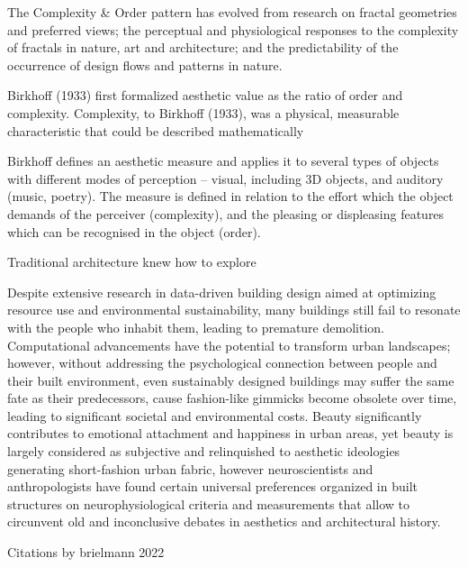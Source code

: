 The Complexity & Order pattern has evolved from research on fractal geometries and preferred views; the perceptual and physiological responses to the complexity of fractals in nature, art and architecture; and the predictability of the occurrence of design flows and patterns in nature.\cite{Browning2014}

Birkhoff (1933)\cite{Birkhoff1933} first formalized aesthetic value as the ratio of order and complexity.
Complexity, to Birkhoff (1933), was a
physical, measurable characteristic that could be described
mathematically \cite{Bies2016}

Birkhoff\cite{Birkhoff1933} defines an aesthetic measure and applies it to several types of objects with different modes of perception – visual, including
3D objects, and auditory (music, poetry).
The measure is defined in relation to the effort which the object demands of the perceiver (complexity), and the pleasing or displeasing features which can be recognised in the object (order).\cite{Douchova2016}




Traditional architecture knew how to explore \cite{Browning2014}



Despite extensive research in data-driven building design aimed at optimizing resource use and environmental sustainability, many buildings still fail to resonate with the people who inhabit them, leading to premature demolition.
Computational advancements have the potential to transform urban landscapes; however, without addressing the psychological connection between people and their built environment, even sustainably designed buildings may suffer the same fate as their predecessors, cause fashion-like gimmicks become obsolete over time, leading to significant societal and environmental costs\cite{Aesthetic2022}.
Beauty significantly contributes to emotional attachment and happiness in urban areas\cite{Brielmann2022}, yet beauty is largely considered as subjective and relinquished to aesthetic ideologies generating short-fashion urban fabric, however neuroscientists and anthropologists have found certain universal preferences organized in built structures on neurophysiological criteria and measurements that allow to circunvent old and inconclusive debates in aesthetics and architectural history\cite{Brielmann2022}.

Citations by brielmann 2022

